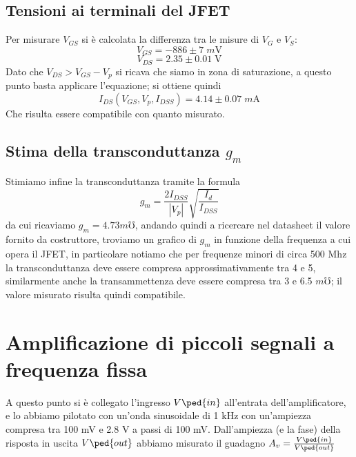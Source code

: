 \documentclass[10pt, a4paper, italian]{article}
\begin{document}
\subsection{Tensioni ai terminali del JFET}
Per misurare $V_{GS}$ si è calcolata la differenza tra le misure di $V_G$ e $V_S$:
\[
V_{GS}=-886 \pm 7 \; \si{m\V}
\]
\[
V_{DS}=2.35 \pm 0.01 \; \si{\V}
\]
Dato che $V_{DS} > V_{GS} - V_p$ si ricava che siamo in zona di saturazione, a questo punto basta applicare l'equazione; si ottiene quindi 
\[
I_{DS}(V_{GS},V_p,I_{DSS})=4.14 \pm 0.07 \; \si{m\A}
\]
Che risulta essere compatibile con quanto misurato.

\subsection{Stima della transconduttanza $g_m$}
Stimiamo infine la transconduttanza tramite la formula
\begin{equation}
g_m = \frac{2 I_{DSS}}{|V_p|}\sqrt{\frac{I_{d}}{I_{DSS}}}
\end{equation}
da cui ricaviamo $g_m = 4.73 \si{m\mho}$, andando quindi a ricercare nel datasheet il valore fornito da costruttore, troviamo un grafico di $g_m$ in funzione della frequenza a cui opera il JFET, in particolare notiamo che per frequenze minori di circa 500 Mhz la transconduttanza deve essere compresa approssimativamente tra 4 e 5, similarmente anche la transammettenza deve essere compresa tra 3 e 6.5 $\si{m\mho}$; il valore misurato risulta quindi compatibile.

\section{Amplificazione di piccoli segnali a frequenza fissa}
A questo punto si è collegato l'ingresso $V\ped{in}$ all'entrata dell'amplificatore, e lo abbiamo pilotato con un'onda sinusoidale di 1 kHz con un'ampiezza compresa tra 100 mV e 2.8 V a passi di 100 mV. Dall'ampiezza (e la fase) della risposta in uscita $V\ped{out}$ abbiamo misurato il guadagno $A_v = \frac{V\ped{in}}{V\ped{out}}$
\end{document}
